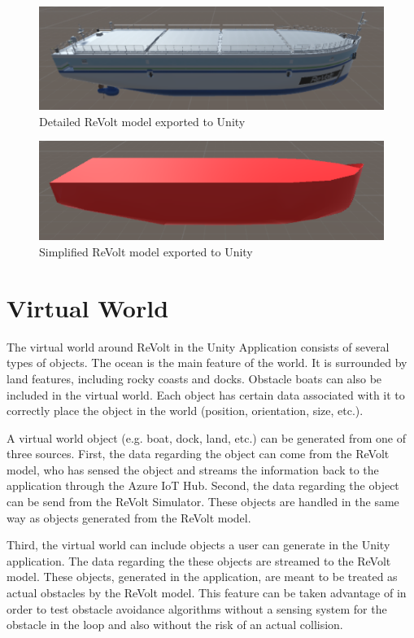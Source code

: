 \begin{figure}[H]
\centering
\includegraphics[scale=0.5]{Images/DetailedModel.png}
\caption{Detailed ReVolt model exported to Unity}
\label{fig:detailedReVoltModel}
\end{figure}

\begin{figure}[H]
\centering
\includegraphics[scale=0.6]{Images/SimplifiedModel.png}
\caption{Simplified ReVolt model exported to Unity}
\label{fig:SimplifiedReVoltModel}
\end{figure}

\section{Virtual World}
The virtual world around ReVolt in the Unity Application consists of several types of objects. The ocean is the main feature of the world. It is surrounded by land features, including rocky coasts and docks. Obstacle boats can also be included in the virtual world. Each object has certain data associated with it to correctly place the object in the world (position, orientation, size, etc.).

A virtual world object (e.g. boat, dock, land, etc.) can be generated from one of three sources. First, the data regarding the object can come from the ReVolt model, who has sensed the object and streams the information back to the application through the Azure IoT Hub. Second, the data regarding the object can be send from the ReVolt Simulator. These objects are handled in the same way as objects generated from the ReVolt model.

Third, the virtual world can include objects a user can generate in the Unity application. The data regarding the these objects are streamed to the ReVolt model. These objects, generated in the application, are meant to be treated as actual obstacles by the ReVolt model. This feature can be taken advantage of in order to test obstacle avoidance algorithms without a sensing system for the obstacle in the loop and also without the risk of an actual collision. 

